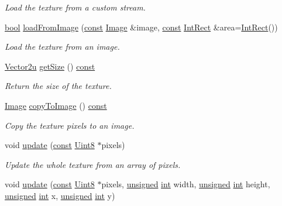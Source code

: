 \begin{DoxyCompactItemize}
\begin{DoxyCompactList}\small\item\em Load the texture from a custom stream. \end{DoxyCompactList}\item 
\hyperlink{term__entry_8h_a002004ba5d663f149f6c38064926abac}{bool} \hyperlink{classsf_1_1_texture_abec4567ad9856a3596dc74803f26fba2}{load\-From\-Image} (\hyperlink{term__entry_8h_a57bd63ce7f9a353488880e3de6692d5a}{const} \hyperlink{classsf_1_1_image}{Image} \&image, \hyperlink{term__entry_8h_a57bd63ce7f9a353488880e3de6692d5a}{const} \hyperlink{namespacesf_a1b1279ab06950b96686cffaacb72fed5}{Int\-Rect} \&area=\hyperlink{namespacesf_a1b1279ab06950b96686cffaacb72fed5}{Int\-Rect}())
\begin{DoxyCompactList}\small\item\em Load the texture from an image. \end{DoxyCompactList}\item 
\hyperlink{namespacesf_a41039649eb65ea7646e2b97cfe124b4f}{Vector2u} \hyperlink{classsf_1_1_texture_a0f370acd8f41c8b97a6959389c521c2c}{get\-Size} () \hyperlink{term__entry_8h_a57bd63ce7f9a353488880e3de6692d5a}{const} 
\begin{DoxyCompactList}\small\item\em Return the size of the texture. \end{DoxyCompactList}\item 
\hyperlink{classsf_1_1_image}{Image} \hyperlink{classsf_1_1_texture_aefc19bcd95565dd2348fd4cec0facddc}{copy\-To\-Image} () \hyperlink{term__entry_8h_a57bd63ce7f9a353488880e3de6692d5a}{const} 
\begin{DoxyCompactList}\small\item\em Copy the texture pixels to an image. \end{DoxyCompactList}\item 
void \hyperlink{classsf_1_1_texture_ae4eab5c6781316840b0c50ad08370963}{update} (\hyperlink{term__entry_8h_a57bd63ce7f9a353488880e3de6692d5a}{const} \hyperlink{namespacesf_a4ef3d630785c4f296f9b4f274c33d78e}{Uint8} $\ast$pixels)
\begin{DoxyCompactList}\small\item\em Update the whole texture from an array of pixels. \end{DoxyCompactList}\item 
void \hyperlink{classsf_1_1_texture_a1352d8e16c2aeb4df586ed65dd2c36b9}{update} (\hyperlink{term__entry_8h_a57bd63ce7f9a353488880e3de6692d5a}{const} \hyperlink{namespacesf_a4ef3d630785c4f296f9b4f274c33d78e}{Uint8} $\ast$pixels, \hyperlink{curses_8priv_8h_aca40206900cfc164654362fa8d4ad1e6}{unsigned} \hyperlink{term__entry_8h_ad65b480f8c8270356b45a9890f6499ae}{int} width, \hyperlink{curses_8priv_8h_aca40206900cfc164654362fa8d4ad1e6}{unsigned} \hyperlink{term__entry_8h_ad65b480f8c8270356b45a9890f6499ae}{int} height, \hyperlink{curses_8priv_8h_aca40206900cfc164654362fa8d4ad1e6}{unsigned} \hyperlink{term__entry_8h_ad65b480f8c8270356b45a9890f6499ae}{int} x, \hyperlink{curses_8priv_8h_aca40206900cfc164654362fa8d4ad1e6}{unsigned} \hyperlink{term__entry_8h_ad65b480f8c8270356b45a9890f6499ae}{int} y)

\end{DoxyCompactItemize}
